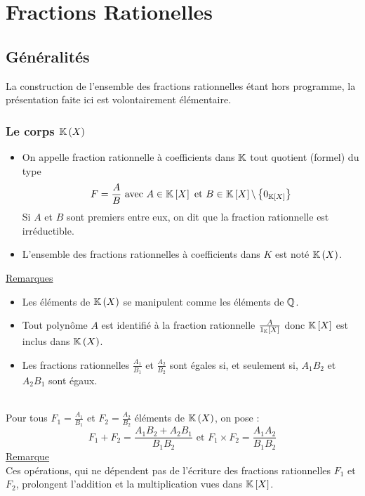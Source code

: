 \chapter{Fractions Rationelles}

\minitoc

\section{Généralités}
La construction de l’ensemble des fractions rationnelles étant hors programme, la présentation faite ici est volontairement élémentaire.
\subsection{Le corps \(\mathbb{K}\left(X\right)\)}
\begin{defi}
    \begin{itemize}
        \item On appelle fraction rationnelle à coefficients dans \(\mathbb{K}\) tout quotient (formel) du type 
        \[F = \frac{A}{B} \text{ avec }A \in \mathbb{K}\left[X\right] \text{ et } B \in \mathbb{K}\left[X\right] \backslash \left\lbrace0_{\mathbb{K}\left[X\right]}\right\rbrace\]
        Si \(A\) et \(B\) sont premiers entre eux, on dit que la fraction rationnelle est irréductible.
        \item L’ensemble des fractions rationnelles à coefficients dans \(K\) est noté \(\mathbb{K}\left(X\right)\).
    \end{itemize}
    \underline{Remarques} \\
    \begin{itemize}
        \item Les éléments de \(\mathbb{K}\left(X\right)\) se manipulent comme les éléments de \(\mathbb{Q}\).
        \item Tout polynôme \(A\) est identifié à la fraction rationnelle \(\frac{A}{1_{\mathbb{K}}\left[X\right]}\) donc \(\mathbb{K} \left[X\right]\)  est inclus dans \(\mathbb{K}\left(X\right)\).
        \item Les fractions rationnelles \(\frac{A_1}{B_1}\) et \(\frac{A_2}{B_2}\) sont égales si, et seulement si, \(A_1B_2\) et \(A_2B_1\) sont égaux.
    \end{itemize}
\end{defi}

\begin{defprop}
    ~\\
    Pour tous \(F_1 = \frac{A_1}{B_1}\) et \(F_2 = \frac{A_2}{B_2}\) éléments de \(\mathbb{K}\left(X\right)\), on pose :
    \[F_1 + F_2 = \frac{A_1B_2 + A_2B_1}{B_1B_2} \text{ et }F_1 \times  F_2 = \frac{A_1A_2}{B_1B_2}\]
    \underline{Remarque} \\
Ces opérations, qui ne dépendent pas de l’écriture des fractions rationnelles \(F_1\) et \(F_2\), prolongent l’addition et la multiplication vues dans \(\mathbb{K}\left[X\right]\).
\end{defprop}

